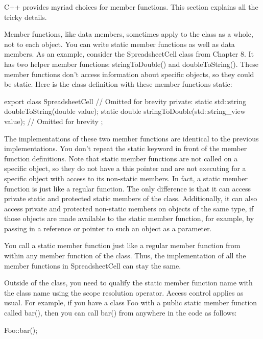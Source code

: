 
C++ provides myriad choices for member functions. This section explains all the tricky details.


Member functions, like data members, sometimes apply to the class as a whole, not to each object. You can write static member functions as well as data members. As an example, consider the SpreadsheetCell class from Chapter 8. It has two helper member functions: stringToDouble() and doubleToString(). These member functions don’t access information about specific objects, so they could be static. Here is the class definition with these member functions static:

\begin{cpp}
export class SpreadsheetCell
{
    // Omitted for brevity
    private:
        static std::string doubleToString(double value);
        static double stringToDouble(std::string_view value);
        // Omitted for brevity
};
\end{cpp}

The implementations of these two member functions are identical to the previous implementations. You don’t repeat the static keyword in front of the member function definitions. Note that static member functions are not called on a specific object, so they do not have a this pointer and are not executing for a specific object with access to its non-static members. In fact, a static member function is just like a regular function. The only difference is that it can access private static and protected static members of the class. Additionally, it can also access private and protected non-static members on objects of the same type, if those objects are made available to the static member function, for example, by passing in a reference or pointer to such an object as a parameter.

You call a static member function just like a regular member function from within any member function of the class. Thus, the implementation of all the member functions in SpreadsheetCell can stay the same.

Outside of the class, you need to qualify the static member function name with the class name using the scope resolution operator. Access control applies as usual. For example, if you have a class Foo with a public static member function called bar(), then you can call bar() from anywhere in the code as follows:

\begin{cpp}
Foo::bar();
\end{cpp}

